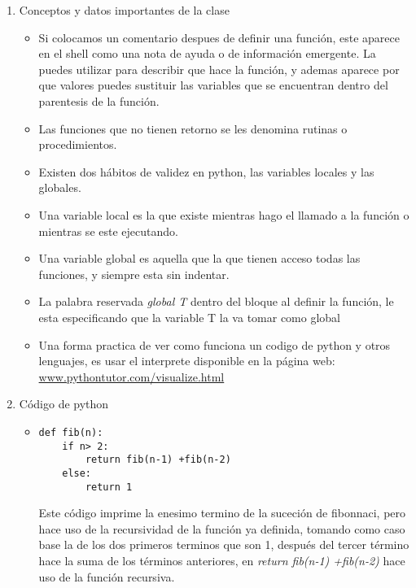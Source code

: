 \documentclass{book}
\begin{document}
	\begin{flushright}
		\date{23 de enero de 2019}
	\end{flushright}


\begin{enumerate}
	\item Conceptos y datos importantes de la clase
	\begin{itemize}
		\item Si colocamos un comentario despues de definir una función, este aparece en el shell como una nota de ayuda o de información emergente. La puedes utilizar para describir que hace la función, y ademas aparece por que valores puedes sustituir las variables que se encuentran dentro del parentesis de la función.
		\item Las funciones que no tienen retorno se les denomina rutinas o procedimientos.
		\item Existen dos hábitos de validez en python, las variables locales y las globales.
		\item Una variable local es la que existe mientras hago el llamado a la función o mientras se este ejecutando.
		\item Una variable global es aquella que la que tienen acceso todas las funciones, y siempre esta sin indentar.
		\item La palabra reservada \textit{global T} dentro del bloque al definir la función, le esta especificando que la variable T la va tomar como global
		\item Una forma practica de ver como funciona un codigo de python y otros lenguajes, es usar el interprete disponible en la página web: \url{www.pythontutor.com/visualize.html}
		
	\end{itemize}
	
	
	
	\item Código de python
	\begin{itemize}
		\item \begin{lstlisting}
def fib(n):
    if n> 2:
        return fib(n-1) +fib(n-2)
    else:
        return 1
		\end{lstlisting} Este código imprime la enesimo termino de la suceción de fibonnaci, pero hace uso de la recursividad de la función ya definida, tomando como caso base la de los dos primeros terminos que son 1, después del tercer término hace la suma de los términos anteriores, en \textit{return fib(n-1) +fib(n-2)} hace uso de la función recursiva.\\
		

\end{itemize}
\end{enumerate}
\end{document}
